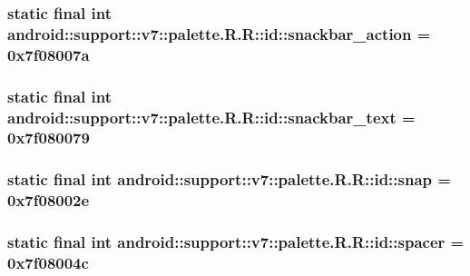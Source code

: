 \hypertarget{classandroid_1_1support_1_1v7_1_1palette_1_1_r_1_1id_b07ad890ebad4ffab62f9e5ccc1c761c}{
\subsubsection[{snackbar\_\-action}]{\setlength{\rightskip}{0pt plus 5cm}static final int android::support::v7::palette.R.R::id::snackbar\_\-action = 0x7f08007a}}
\label{classandroid_1_1support_1_1v7_1_1palette_1_1_r_1_1id_b07ad890ebad4ffab62f9e5ccc1c761c}


\hypertarget{classandroid_1_1support_1_1v7_1_1palette_1_1_r_1_1id_f476d20b2a9579d1eb959cb1505555f9}{
\subsubsection[{snackbar\_\-text}]{\setlength{\rightskip}{0pt plus 5cm}static final int android::support::v7::palette.R.R::id::snackbar\_\-text = 0x7f080079}}
\label{classandroid_1_1support_1_1v7_1_1palette_1_1_r_1_1id_f476d20b2a9579d1eb959cb1505555f9}


\hypertarget{classandroid_1_1support_1_1v7_1_1palette_1_1_r_1_1id_a21c295078627a7dd8886dea06f2fc49}{
\subsubsection[{snap}]{\setlength{\rightskip}{0pt plus 5cm}static final int android::support::v7::palette.R.R::id::snap = 0x7f08002e}}
\label{classandroid_1_1support_1_1v7_1_1palette_1_1_r_1_1id_a21c295078627a7dd8886dea06f2fc49}


\hypertarget{classandroid_1_1support_1_1v7_1_1palette_1_1_r_1_1id_23c9dbb99a912647577e75e38d478dbb}{
\subsubsection[{spacer}]{\setlength{\rightskip}{0pt plus 5cm}static final int android::support::v7::palette.R.R::id::spacer = 0x7f08004c}}
\label{classandroid_1_1support_1_1v7_1_1palette_1_1_r_1_1id_23c9dbb99a912647577e75e38d478dbb}


